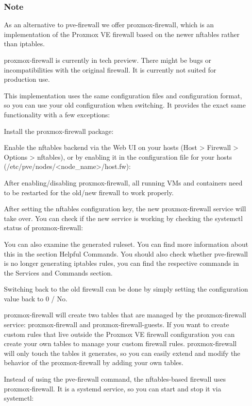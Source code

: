 \subsubsection{Note}

As an alternative to pve-firewall we offer proxmox-firewall, which is an implementation of the Proxmox VE firewall based on the newer nftables rather than iptables.

proxmox-firewall is currently in tech preview. There might be bugs or incompatibilities with the original firewall. It is currently not suited for production use.

This implementation uses the same configuration files and configuration format, so you can use your old configuration when switching. It provides the exact same functionality with a few exceptions:

Install the proxmox-firewall package:

Enable the nftables backend via the Web UI on your hosts (Host > Firewall > Options > nftables), or by enabling it in the configuration file for your hosts (/etc/pve/nodes/<node_name>/host.fw):

After enabling/disabling proxmox-firewall, all running VMs and containers need to be restarted for the old/new firewall to work properly.

After setting the nftables configuration key, the new proxmox-firewall service will take over. You can check if the new service is working by checking the systemctl status of proxmox-firewall:

You can also examine the generated ruleset. You can find more information about this in the section Helpful Commands. You should also check whether pve-firewall is no longer generating iptables rules, you can find the respective commands in the Services and Commands section.

Switching back to the old firewall can be done by simply setting the configuration value back to 0 / No.

proxmox-firewall will create two tables that are managed by the proxmox-firewall service: proxmox-firewall and proxmox-firewall-guests. If you want to create custom rules that live outside the Proxmox VE firewall configuration you can create your own tables to manage your custom firewall rules. proxmox-firewall will only touch the tables it generates, so you can easily extend and modify the behavior of the proxmox-firewall by adding your own tables.

Instead of using the pve-firewall command, the nftables-based firewall uses proxmox-firewall. It is a systemd service, so you can start and stop it via systemctl:

